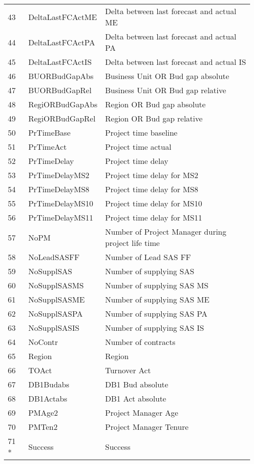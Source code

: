 \begin{longtable}[ht]{p{} p{}p{}}
43    & DeltaLastFCActME & Delta between last forecast and actual ME \\
44    & DeltaLastFCActPA & Delta between last forecast and actual PA \\
45    & DeltaLastFCActIS & Delta between last forecast and actual IS \\
46    & BUORBudGapAbs & Business Unit OR Bud gap absolute \\
47    & BUORBudGapRel & Business Unit OR Bud gap relative \\
48    & RegiORBudGapAbs & Region OR Bud gap absolute \\
49    & RegiORBudGapRel & Region OR Bud gap relative \\
50    & PrTimeBase & Project time baseline \\
51    & PrTimeAct & Project time actual \\
52    & PrTimeDelay & Project time delay \\
53    & PrTimeDelayMS2 & Project time delay for MS2 \\
54    & PrTimeDelayMS8 & Project time delay for MS8 \\
55    & PrTimeDelayMS10 & Project time delay for MS10 \\
56    & PrTimeDelayMS11 & Project time delay for MS11 \\
57    & NoPM  & Number of Project Manager during project life time \\
58    & NoLeadSASFF & Number of Lead SAS FF \\
59    & NoSupplSAS & Number of supplying SAS \\
60    & NoSupplSASMS & Number of supplying SAS MS \\
61    & NoSupplSASME & Number of supplying SAS ME \\
62    & NoSupplSASPA & Number of supplying SAS PA \\
63    & NoSupplSASIS & Number of supplying SAS IS \\
64    & NoContr & Number of contracts \\
65    & Region & Region \\
66    & TOAct & Turnover Act \\
67    & DB1Budabs & DB1 Bud absolute \\
68    & DB1Actabs & DB1 Act absolute \\
69    & PMAge2 & Project Manager Age \\
70    & PMTen2 & Project Manager Tenure \\
71 *   & Success & Success \\

\end{longtable}
